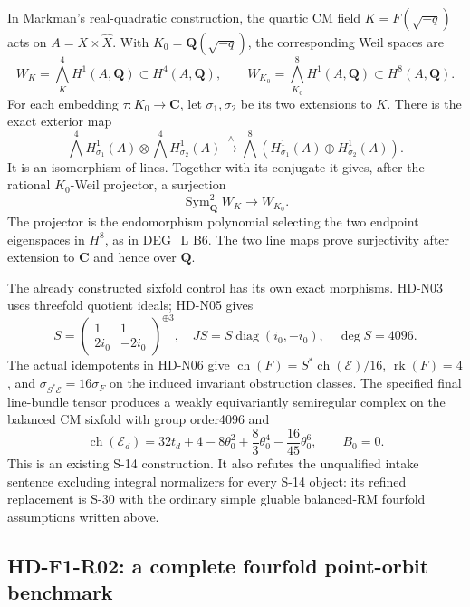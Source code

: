 In Markman's real-quadratic construction, the quartic CM field
$K=F(\sqrt{-q})$ acts on $A=X\times\widehat X$. With
$K_0=\mathbf Q(\sqrt{-q})$, the corresponding Weil spaces are
\[
 W_K=\bigwedge_K^4H^1(A,\mathbf Q)\subset H^4(A,\mathbf Q),
 \qquad
 W_{K_0}=\bigwedge_{K_0}^8H^1(A,\mathbf Q)\subset H^8(A,\mathbf Q).
\]
For each embedding $\tau:K_0\to\mathbf C$, let $\sigma_1,\sigma_2$
be its two extensions to $K$. There is the exact exterior map
\[
 \bigwedge^4H^1_{\sigma_1}(A)\otimes
 \bigwedge^4H^1_{\sigma_2}(A)
 \xrightarrow{\ \wedge\ }
 \bigwedge^8\left(H^1_{\sigma_1}(A)\oplus
                         H^1_{\sigma_2}(A)\right).
 \tag{F1R1.4}
\]
It is an isomorphism of lines. Together with its conjugate it gives,
after the rational $K_0$-Weil projector, a surjection
\[
                    \operatorname{Sym}^2_{\mathbf Q}W_K
                              \longrightarrow W_{K_0}.
 \tag{F1R1.5}
\]
The projector is the endomorphism polynomial selecting the two
endpoint eigenspaces in $H^8$, as in DEG\_L B6. The two line maps
prove surjectivity after extension to $\mathbf C$ and hence over
$\mathbf Q$.

The already constructed sixfold control has its own exact morphisms.
HD-N03 uses threefold quotient ideals; HD-N05 gives
\[
 S=\begin{pmatrix}1&1\\2i_0&-2i_0\end{pmatrix}^{\oplus3},
 \quad JS=S\operatorname{diag}(i_0,-i_0),\quad\deg S=4096.
\]
The actual idempotents in HD-N06 give
$\operatorname{ch}(F)=S^*\operatorname{ch}(\mathcal E)/16$,
$\operatorname{rk}(F)=4$, and $\sigma_{S^*\mathcal E}=16\sigma_F$
on the induced invariant obstruction classes. The specified final
line-bundle tensor produces a weakly equivariantly semiregular
complex on the balanced CM sixfold with group order4096 and
\[
 \operatorname{ch}(\mathcal E_d)=32t_d+4-8\theta_0^2
                 +\frac83\theta_0^4-\frac{16}{45}\theta_0^6,
 \qquad B_0=0.
 \tag{F1R1.6}
\]
This is an existing S-14 construction. It also refutes the unqualified
intake sentence excluding integral normalizers for every S-14
object: its refined replacement is S-30 with the ordinary simple
gluable balanced-RM fourfold assumptions written above.

\subsection{HD-F1-R02: a complete fourfold point-orbit benchmark}

